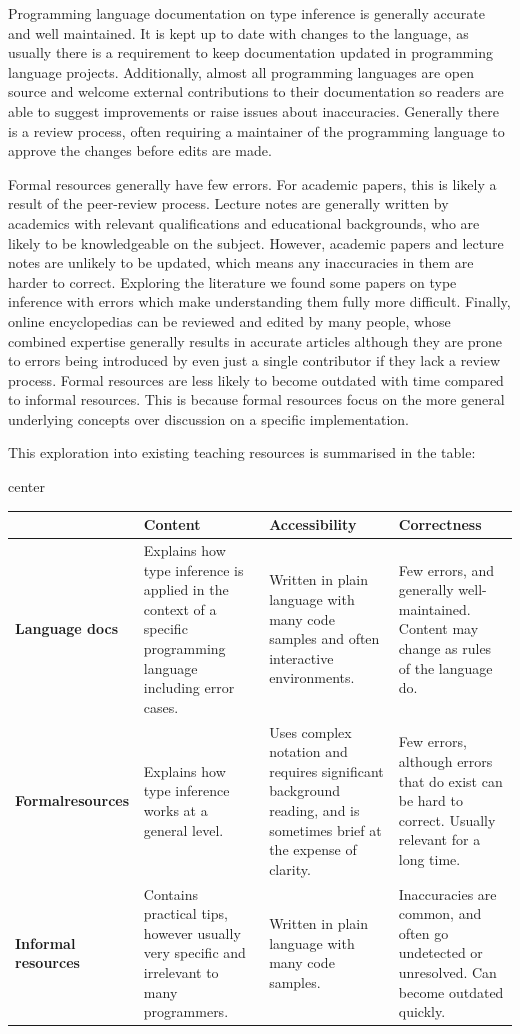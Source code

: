 \documentclass[a4paper,fleqn,oneside,12pt]{report}
\begin{document}
Programming language documentation on type inference is generally accurate and well maintained. It is kept up to date with changes to the language, as usually there is a requirement to keep documentation updated in programming language projects. Additionally, almost all programming languages are open source and welcome external contributions to their documentation so readers are able to suggest improvements or raise issues about inaccuracies. Generally there is a review process, often requiring a maintainer of the programming language to approve the changes before edits are made.

Formal resources generally have few errors. For academic papers, this is likely a result of the peer-review process. Lecture notes are generally written by academics with relevant qualifications and educational backgrounds, who are likely to be knowledgeable on the subject. However, academic papers and lecture notes are unlikely to be updated, which means any inaccuracies in them are harder to correct. Exploring the literature we found some papers on type inference with errors which make understanding them fully more difficult. Finally, online encyclopedias can be reviewed and edited by many people, whose combined expertise generally results in accurate articles although they are prone to errors being introduced by even just a single contributor if they lack a review process. Formal resources are less likely to become outdated with time compared to informal resources. This is because formal resources focus on the more general underlying concepts over discussion on a specific implementation.

This exploration into existing teaching resources is summarised in the table:

\begin{adjustbox}{center}\begin{tabularx}{1.2\textwidth}{ |p{2cm}|X|X|X| }
  \hline
   & \textbf{Content} & \textbf{Accessibility} & \textbf{Correctness} \\
  \hline
  \textbf{Language docs} & Explains how type inference is applied in the context of a specific programming language including error cases. & Written in plain language with many code samples and often interactive environments. & Few errors, and generally well-maintained. Content may change as rules of the language do. \\
  \hline
  \textbf{Formal\newline resources} & Explains how type inference works at a general level. & Uses complex notation and requires significant background reading, and is sometimes brief at the expense of clarity. & Few errors, although errors that do exist can be hard to correct. Usually relevant for a long time. \\
  \hline
  \textbf{Informal resources} & Contains practical tips, however usually very specific and irrelevant to many programmers. & Written in plain language with many code samples. & Inaccuracies are common, and often go undetected or unresolved. Can become outdated quickly. \\
  \hline
\end{tabularx}\end{adjustbox}\\
\end{document}
